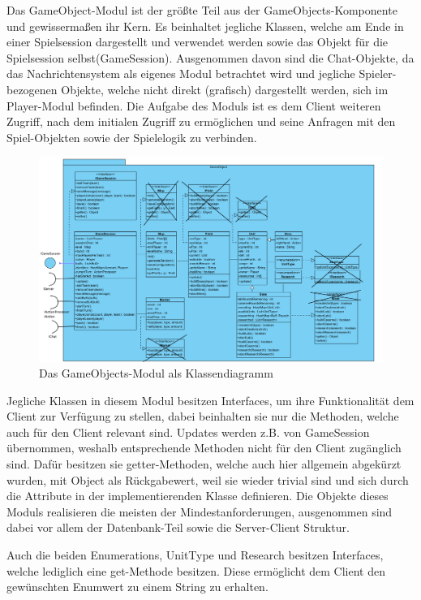 \documentclass[fontsize=12pt,paper=a4,twoside]{scrartcl}
\begin{document}
Das GameObject-Modul ist der größte Teil aus der GameObjects-Komponente und gewissermaßen ihr Kern. Es beinhaltet jegliche Klassen, welche am Ende in einer Spielsession dargestellt und verwendet werden sowie das Objekt für die Spielsession selbst(GameSession). Ausgenommen davon sind die Chat-Objekte, da das Nachrichtensystem als eigenes Modul betrachtet wird und jegliche Spieler-bezogenen Objekte, welche nicht direkt (grafisch) dargestellt werden, sich im Player-Modul befinden. Die Aufgabe des Moduls ist es dem Client weiteren Zugriff, nach dem initialen Zugriff zu ermöglichen und seine Anfragen mit den Spiel-Objekten sowie der Spielelogik zu verbinden.

\begin{figure}[h]
\centering
\includegraphics[width=1.0\linewidth]{GameObjectsClass}
\caption{Das GameObjects-Modul als Klassendiagramm}
\label{fig:GameObjectsClass}
\end{figure}

Jegliche Klassen in diesem Modul besitzen Interfaces, um ihre Funktionalität dem Client zur Verfügung zu stellen, dabei beinhalten sie nur die Methoden, welche auch für den Client relevant sind. Updates werden z.B. von GameSession übernommen, weshalb entsprechende Methoden nicht für den Client zugänglich sind. Dafür besitzen sie getter-Methoden, welche auch hier allgemein abgekürzt wurden, mit Object als Rückgabewert, weil sie wieder trivial sind und sich durch die Attribute in der implementierenden Klasse definieren. Die Objekte dieses Moduls realisieren die meisten der Mindestanforderungen, ausgenommen sind dabei vor allem der Datenbank-Teil sowie die Server-Client Struktur.

Auch die beiden Enumerations, UnitType und Research besitzen Interfaces, welche lediglich eine get-Methode besitzen. Diese ermöglicht dem Client den gewünschten Enumwert zu einem String zu erhalten.
\end{document}
